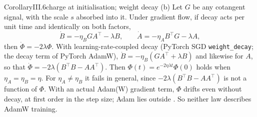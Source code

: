 \begin{restate}{Corollary}{III.6}{charge at initialisation; weight decay}
(b) Let $G$ be any cotangent signal, with the scale $s$ absorbed into it. Under gradient flow, if decay acts per unit time
and identically on both factors,
\[\dot B=-\eta_BGA^\top-\lambda B,\qquad\dot A=-\eta_AB^\top G-\lambda A,\]
then $\dot\Phi=-2\lambda\Phi$. With learning-rate-coupled decay (PyTorch SGD \texttt{weight\_decay}; the decay term of
PyTorch AdamW), $\dot B=-\eta_B(GA^\top+\lambda B)$ and likewise for $A$, so that $\dot\Phi=-2\lambda(B^\top B-AA^\top)$.
Then $\Phi(t)=e^{-2\eta\lambda t}\Phi(0)$ holds when $\eta_A=\eta_B=\eta$. For $\eta_A\ne\eta_B$ it fails in general,
since $-2\lambda(B^\top B-AA^\top)$ is not a function of $\Phi$. With an actual Adam(W) gradient term, $\Phi$ drifts even
without decay, at first order in the step size; Adam lies outside . So neither law describes AdamW
training.
\end{restate}

